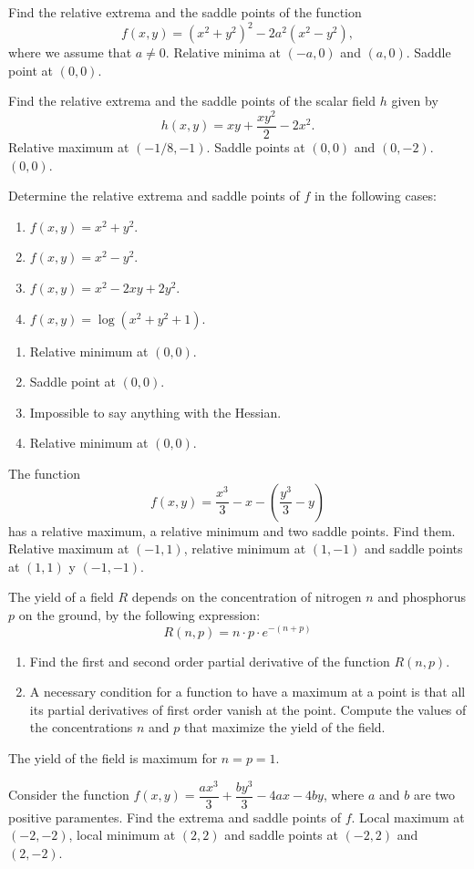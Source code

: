 
{Find the relative extrema and the saddle points of the function
\[
f(x,y) = (x^2+y^2)^2-2a^2(x^2-y^2),
\]
where we assume that $a\neq 0$.
}
{Relative minima at $(-a,0)$ and $(a,0)$. Saddle point at $(0,0)$.
}
{
}


{Find the relative extrema and the saddle points of the scalar field $h$ given by
\[
h(x,y) = xy+\frac{xy^2}{2}-2x^2.
\]
}
{Relative maximum at $(-1/8,-1)$. Saddle points at $(0,0)$ and $(0,-2)$.
$(0,0)$.
}
{
}

{Determine the relative extrema and saddle points of $f$ in the following cases:
\begin{enumerate}
\item $f(x,y) = x^2+y^2$.
\item $f(x,y) = x^2-y^2$.
\item $f(x,y) = x^2-2xy+2y^2$.
\item $f(x,y) = \log(x^2+y^2+1)$.
\end{enumerate}
}
{\begin{enumerate}
\item Relative minimum at $(0,0)$.
\item Saddle point at $(0,0)$.
\item Impossible to say anything with the Hessian.
\item Relative minimum at $(0,0)$.
\end{enumerate}
}
{
}


{The function
\[
f(x,y) = \frac{x^3}{3}-x-\left(\frac{y^3}{3}-y\right)
\]
has a relative maximum, a relative minimum and two saddle points.
Find them.
}
{Relative maximum at $(-1,1)$, relative minimum at $(1,-1)$ and saddle points at $(1,1)$ y $(-1,-1)$.
}
{
}


{The yield of a field $R$ depends on the concentration of nitrogen $n$ and phosphorus $p$ on the ground, by the following expression:
\[
R(n,p)=n\cdot p\cdot e^{-(n+p)}
\]
\begin{enumerate}
\item Find the first and second order partial derivative of the function $R(n,p)$.
\item A necessary condition for a function to have a maximum at a point is that all its partial derivatives of first order vanish at the point.
Compute the values of the concentrations $n$ and $p$ that maximize the yield of the field.
\end{enumerate}
}
{The yield of the field is maximum for $n=p=1$.
}
{
}

{Consider the function $f(x,y)=\dfrac{ax^3}{3} + \dfrac{by^3}{3}-4ax-4by$, where $a$ and $b$ are two positive paramentes.
Find the extrema and saddle points of $f$.
}
{Local maximum at $(-2,-2)$, local minimum at $(2,2)$ and saddle points at $(-2,2)$ and $(2,-2)$.
}
{
}

